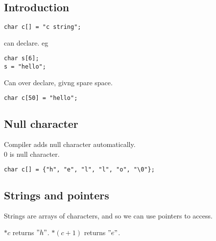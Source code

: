 
\subsection{Introduction}

\begin{verbatim}
char c[] = "c string";
\end{verbatim}

can declare. eg

\begin{verbatim}
char s[6];
s = "hello";
\end{verbatim}



Can over declare, givng spare space.
\begin{verbatim}
char c[50] = "hello";
\end{verbatim}


\subsection{Null character}

Compiler adds null character automatically.\\0 is null character.

\begin{verbatim}
char c[] = {"h", "e", "l", "l", "o", "\0"};
\end{verbatim}

\subsection{Strings and pointers}

Strings are arrays of characters, and so we can use pointers to access. 

\(*c\) returns \("h"\). \(*(c+1)\) returns \("e"\).





